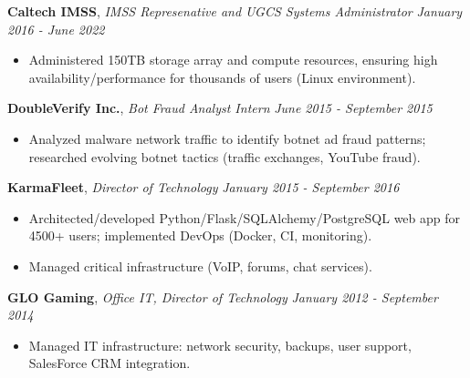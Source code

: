 \documentclass[8pt]{article}
\newenvironment{changemargin}[2]{%
  \begin{list}{}{%
    \setlength{\topsep}{0pt}%
    \setlength{\leftmargin}{#1}%
    \setlength{\rightmargin}{#2}%
    \setlength{\listparindent}{\parindent}%
    \setlength{\itemindent}{\parindent}%
    \setlength{\parsep}{0pt}%
    \setlength{\itemsep}{-2pt}%
  }%
  \item[]}{\end{list}
}
\newenvironment{body} {
	\vspace*{-10pt}
	\begin{changemargin}{-0.25in}{-0.5in}
  }	
	{\end{changemargin}
}
\begin{document}
\begin{body}
	\textbf{Caltech IMSS}, \emph{IMSS Represenative and UGCS Systems Administrator} \hfill \emph{January 2016 - June 2022}\\
	\vspace*{-6pt}
	\begin{itemize} \itemsep -2pt
		\item Administered 150TB storage array and compute resources, ensuring high availability/performance for thousands of users (Linux environment).
	\end{itemize}
	\vspace*{-6pt}

	\textbf{DoubleVerify Inc.}, \emph{Bot Fraud Analyst Intern} \hfill \emph{June 2015 - September 2015}\\
	\vspace*{-6pt}
	\begin{itemize} \itemsep -2pt
		\item Analyzed malware network traffic to identify botnet ad fraud patterns; researched evolving botnet tactics (traffic exchanges, YouTube fraud).
	\end{itemize}
	\vspace*{-6pt}

	\textbf{KarmaFleet}, \emph{Director of Technology} \hfill \emph{January 2015 - September 2016}\\
	\vspace*{-6pt}
	\begin{itemize} \itemsep -2pt
		\item Architected/developed Python/Flask/SQLAlchemy/PostgreSQL web app for 4500+ users; implemented DevOps (Docker, CI, monitoring).
		\item Managed critical infrastructure (VoIP, forums, chat services).
	\end{itemize}
	\vspace*{-6pt}

	\textbf{GLO Gaming}, \emph{Office IT, Director of Technology} \hfill \emph{January 2012 - September 2014}\\
	\vspace*{-6pt}
	\begin{itemize} \itemsep -2pt
		\item Managed IT infrastructure: network security, backups, user support, SalesForce CRM integration.
	\end{itemize}
	\vspace*{-6pt}

	\smallskip
	\vspace*{-11pt}
	\smallskip
\end{body}
\end{document}
